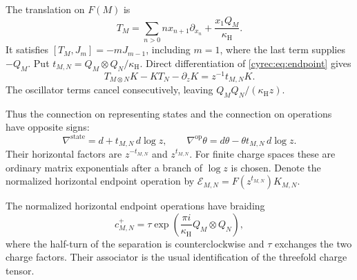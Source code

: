 The translation on $F(M)$ is
\begin{equation}\label{cyrec:eq:translation}
 T_M=\sum_{n>0}n x_{n+1}\partial_{x_n}
                       +\frac{x_1Q_M}{\kappa_{\mathrm H}}.
\end{equation}
It satisfies $[T_M,J_m]=-mJ_{m-1}$, including $m=1$, where the
last term supplies $-Q_M$. Put
$t_{M,N}=Q_M\otimes Q_N/\kappa_{\mathrm H}$.
Direct differentiation of \eqref{cyrec:eq:endpoint} gives
\begin{equation}\label{cyrec:eq:translation-defect}
 T_{M\otimes N}K-KT_N-\partial_zK=z^{-1}t_{M,N}K.
\end{equation}
The oscillator terms cancel consecutively, leaving
$Q_MQ_N/(\kappa_{\mathrm H}z)$.

Thus the connection on representing states and the connection on
operations have opposite signs:
\begin{equation}\label{cyrec:eq:connections}
 \nabla^{\mathrm{state}}=d+t_{M,N}\,d\log z,
 \qquad
 \nabla^{\mathrm{op}}\theta=d\theta-\theta t_{M,N}\,d\log z.
\end{equation}
Their horizontal factors are $z^{-t_{M,N}}$ and $z^{t_{M,N}}$.
For finite charge spaces these are ordinary matrix exponentials
after a branch of $\log z$ is chosen.
Denote the normalized horizontal endpoint operation by
$\mathcal E_{M,N}=F(z^{t_{M,N}})K_{M,N}$.

\begin{proposition}\label{cyrec:prop:exchange}
The normalized horizontal endpoint operations have braiding
\begin{equation}\label{cyrec:eq:braiding}
 c^+_{M,N}=\tau\exp\left(\frac{\pi i}{\kappa_{\mathrm H}}
                                      Q_M\otimes Q_N\right),
\end{equation}
where the half-turn of the separation is counterclockwise and
$\tau$ exchanges the two charge factors. Their associator is the
usual identification of the threefold charge tensor.
\end{proposition}

